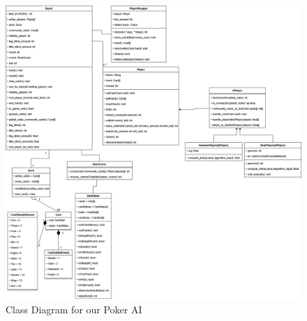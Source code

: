 \clearpage
\begin{figure}[H]
    \centering
    \includegraphics[scale=0.4]{resources/Poker_AI_-Class_Diagram.drawio.png}
    \caption{Class Diagram for our Poker AI}
    \label{fig:classDiagram}
\end{figure}



